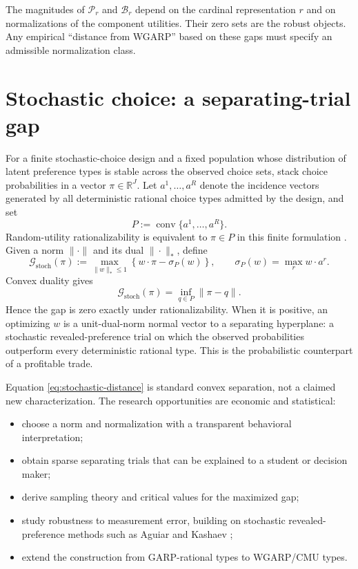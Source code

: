 \documentclass[11pt]{article}
\newcommand{\R}{\mathbb{R}}
\newcommand{\B}{\mathcal{B}}
\newcommand{\cG}{\mathcal{G}}
\newcommand{\cP}{\mathcal{P}}
\theoremstyle{definition}
\theoremstyle{remark}
\begin{document}
The magnitudes of $\cP_r$ and $\B_r$ depend on the cardinal representation $r$ and on
normalizations of the component utilities.  Their zero sets are the robust objects.  Any empirical
``distance from WGARP'' based on these gaps must specify an admissible normalization class.

\section{Stochastic choice: a separating-trial gap}

For a finite stochastic-choice design and a fixed population whose distribution of latent
preference types is stable across the observed choice sets, stack choice probabilities in a vector
$\pi\in\R^J$.  Let $a^1,\ldots,a^R$ denote the incidence vectors generated by all deterministic
rational choice types admitted by the design, and set
\[
  P:=\operatorname{conv}\{a^1,\ldots,a^R\}.
\]
Random-utility rationalizability is equivalent to $\pi\in P$ in this finite formulation
\cite{McFadden2005,KitamuraStoye2018}.  Given a norm $\|\cdot\|$ and its dual
$\|\cdot\|_*$, define
\begin{equation}
  \cG_{\mathrm{stoch}}(\pi)
  :=\max_{\|w\|_*\le1}
  \left\{w\cdot\pi-\sigma_P(w)\right\},
  \qquad
  \sigma_P(w)=\max_r w\cdot a^r.
  \label{eq:stochastic-gap}
\end{equation}
Convex duality gives
\begin{equation}
  \cG_{\mathrm{stoch}}(\pi)
  =\inf_{q\in P}\|\pi-q\|.
  \label{eq:stochastic-distance}
\end{equation}
Hence the gap is zero exactly under rationalizability.  When it is positive, an optimizing
$w$ is a unit-dual-norm normal vector to a separating hyperplane: a stochastic
revealed-preference trial on which the
observed probabilities outperform every deterministic rational type.  This is the probabilistic
counterpart of a profitable trade.

Equation \eqref{eq:stochastic-distance} is standard convex separation, not a claimed new
characterization.  The research opportunities are economic and statistical:
\begin{itemize}
  \item choose a norm and normalization with a transparent behavioral interpretation;
  \item obtain sparse separating trials that can be explained to a student or decision maker;
  \item derive sampling theory and critical values for the maximized gap;
  \item study robustness to measurement error, building on stochastic revealed-preference methods
  such as Aguiar and Kashaev \cite{AguiarKashaev2021};
  \item extend the construction from GARP-rational types to WGARP/CMU types.
\end{itemize}
\end{document}
